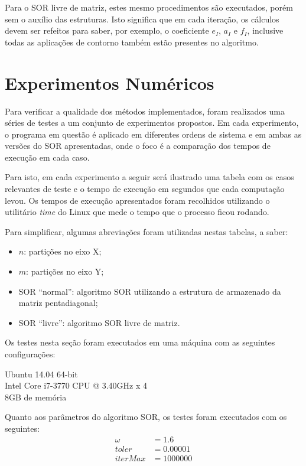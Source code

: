 \documentclass[
	11pt,				%
	oneside,			%
	a4paper,			%
	english,			%
	brazil,				%
	]{article}
\begin{document}
Para o SOR livre de matriz, estes mesmo procedimentos são executados, porém sem 
o auxílio das estruturas. Isto significa que em cada iteração, os cálculos 
devem ser refeitos para saber, por exemplo, o coeficiente $e_I$, $a_I$ e $f_I$, 
inclusive todas as aplicações de contorno também estão presentes no algoritmo.

\section{Experimentos Numéricos}
Para verificar a qualidade dos métodos implementados, foram realizados uma 
séries de testes a um conjunto de experimentos propostos. Em cada experimento, 
o programa em questão é aplicado em diferentes ordens de sistema e em ambas as 
versões do SOR apresentadas, onde o foco é a comparação dos tempos de execução 
em cada caso.

Para isto, em cada experimento a seguir será ilustrado uma tabela com os casos 
relevantes de teste e o tempo de execução em segundos que cada computação 
levou. Os tempos de execução apresentados foram recolhidos utilizando 
o utilitário \textit{time} do Linux que mede o tempo que o processo ficou 
rodando.

Para simplificar, algumas abreviações foram utilizadas nestas tabelas, a saber:
\begin{itemize}
 \item $n$: partições no eixo X;
 \item $m$: partições no eixo Y;
 \item SOR ``normal'': algoritmo SOR utilizando a estrutura de
 armazenado da matriz pentadiagonal;
 \item SOR ``livre'': algoritmo SOR livre de matriz.
\end{itemize}

Os testes nesta seção foram executados em uma máquina com as seguintes 
configurações:

Ubuntu 14.04 64-bit \\
\indent Intel Core i7-3770 CPU @ 3.40GHz x 4 \\
\indent 8GB de memória

Quanto aos parâmetros do algoritmo SOR, os testes foram executados com os 
seguintes:
\begin{align*}
\omega &= 1.6 \\
toler &= 0.00001 \\
iterMax &= 1000000 
\end{align*}
\end{document}
